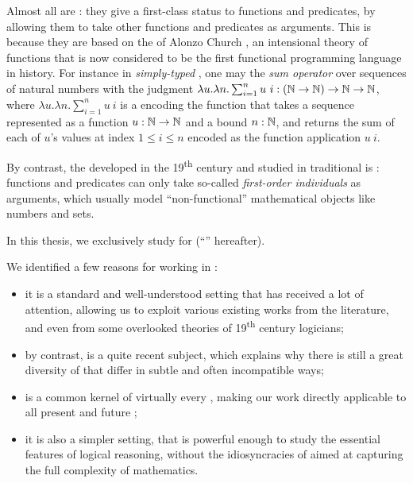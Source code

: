 \AP Almost all  are : they give a
first-class status to functions and predicates, by allowing them to take other
functions and predicates as arguments. This is because they are based on the
 of Alonzo Church
, an intensional theory of
 functions that is now considered to be the first functional
programming language in history. For instance in \emph{simply-typed}
 , one may
 the \emph{sum operator} over sequences of natural numbers with the
judgment $\lambda u. \lambda n. \sum_{i = 1}^{n}{u~i} : (\mathbb{N} \to \mathbb{N}) \to
\mathbb{N} \to \mathbb{N}$, where $\lambda u. \lambda n. \sum_{i = 1}^{n}{u~i}$ is a
 encoding the  function that takes a
sequence represented as a function $u : \mathbb{N} \to \mathbb{N}$ and a bound $n :
\mathbb{N}$, and returns the sum of each of $u$'s values at index $1 \leq i \leq n$
encoded as the function application $u~i$.

\AP By contrast, the  developed in the
19\textsuperscript{th} century and studied in traditional  is
: functions and predicates can only take so-called
\emph{first-order individuals} as arguments, which usually model
``non-functional'' mathematical objects like numbers and sets.

\begin{emphpar}
In this thesis, we exclusively study  for
\emph{}  (``'' hereafter).
\end{emphpar}

We identified a few reasons for working in :
\begin{itemize}
  \item it is a standard and well-understood setting that has received a lot of
  attention, allowing us to exploit various existing works from the  literature, and even from some overlooked theories of
  19\textsuperscript{th} century logicians;
  \item by contrast,  is a quite recent subject, which explains why there is still a
  great diversity of  that differ in subtle and often incompatible
  ways;
  \item {} is a common kernel of virtually every , making our work
  directly applicable to all present and future ;
  \item it is also a simpler setting, that is powerful enough to study the
  essential features of logical reasoning, without the idiosyncracies of  aimed at capturing the full complexity of mathematics.
\end{itemize}

